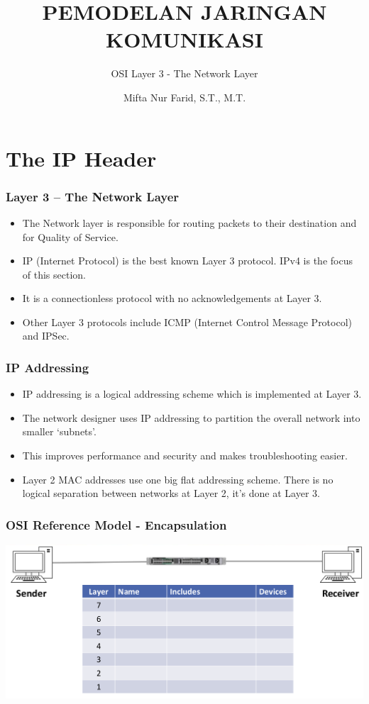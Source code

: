 \documentclass[pdflatex,compress]{beamer}
\title{PEMODELAN JARINGAN KOMUNIKASI}
\subtitle{OSI Layer 3 - The Network Layer}
\author{Mifta Nur Farid, S.T., M.T.}
\begin{document}
\maketitle

\section{The IP Header}

\begin{frame}
	\frametitle{Layer 3 – The Network Layer}
	\begin{itemize}
		\item The Network layer is responsible for routing packets to their destination and for Quality of Service.
		\item IP (Internet Protocol) is the best known Layer 3 protocol. IPv4 is the focus of this section.
		\item It is a connectionless protocol with no acknowledgements at Layer 3.
		\item Other Layer 3 protocols include ICMP (Internet Control Message Protocol) and IPSec.
	\end{itemize}
\end{frame}

\begin{frame}
	\frametitle{IP Addressing}
	\begin{itemize}
		\item IP addressing is a logical addressing scheme which is implemented at Layer 3.
		\item The network designer uses IP addressing to partition the overall network into smaller ‘subnets’.
		\item This improves performance and security and makes troubleshooting easier.
		\item Layer 2 MAC addresses use one big flat addressing scheme. There is no logical separation between networks at Layer 2, it’s done at Layer 3.
	\end{itemize}
\end{frame}

\begin{frame}
	\frametitle{OSI Reference Model - Encapsulation}
	\begin{center}
		\includegraphics[width=\linewidth]{img/img01}
	\end{center}
\end{frame}
\end{document}
